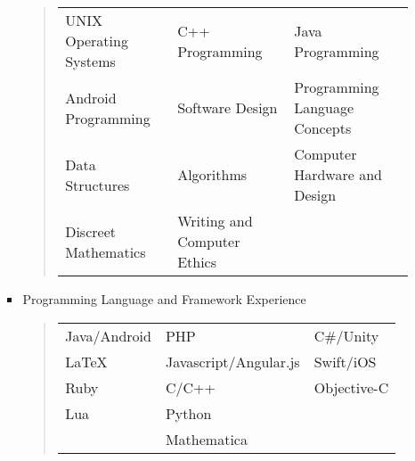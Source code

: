 \begin{enumerate}[label={\Roman*}.]
\begin{itemize}
\begin{itemize}
\begin{quote}
	      	      	      	\def\arraystretch{1.1}
	      	      	      	\begin{tabular}{l l l}
	      	      	      		UNIX Operating Systems & C++ Programming & Java Programming              \\
	      	      	      		Android Programming    & Software Design & Programming Language Concepts \\
	      	      	      		Data Structures        & Algorithms      & Computer Hardware and Design  \\
	      	      	      		Discreet Mathematics & Writing and Computer Ethics
	      	      	      	\end{tabular}
	      	      	      \end{quote}
	      	      	\item Programming Language and Framework Experience
	      	      	      \begin{quote}
	      	      	      	\def\arraystretch{1.1}
	      	      	      	\begin{tabular}{l l l}
	      	      	      		Java/Android & PHP                   & C\#/Unity   \\
	      	      	      		\LaTeX       & Javascript/Angular.js & Swift/iOS   \\
	      	      	      		Ruby         & C/C++                 & Objective-C \\
	      	      	      		Lua          & Python                &             \\
	      	      	      		             & Mathematica           &
	      	      	      	\end{tabular}
	      	      	      \end{quote}
	      	      \end{itemize}
	      \end{itemize}
\end{enumerate}
